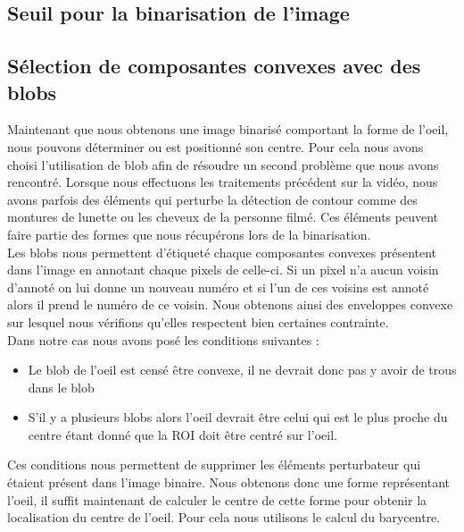 \subsection{Seuil pour la binarisation de l'image}


\subsection{Sélection de composantes convexes avec des blobs}
Maintenant que nous obtenons une image binarisé comportant la forme de l'oeil, nous pouvons déterminer ou est
positionné son centre. Pour cela nous avons choisi l'utilisation de blob afin de résoudre un second 
problème que nous avons rencontré. Lorsque nous effectuons les traitements précédent sur la vidéo, nous avons
parfois des éléments qui perturbe la détection de contour comme des montures de lunette ou les cheveux de la personne 
filmé. Ces éléments peuvent faire partie des formes que nous récupérons lors de la binarisation.\\ 

Les blobs nous permettent d'étiqueté chaque composantes convexes présentent dans l'image en annotant
chaque pixels de celle-ci. Si un pixel n'a aucun voisin d'annoté on lui donne un nouveau numéro et si
l'un de ces voisins est annoté alors il prend le numéro de ce voisin. Nous obtenons ainsi des enveloppes
convexe sur lesquel nous vérifions qu'elles respectent bien certaines contrainte.\\

Dans notre cas nous avons posé les conditions suivantes :
\begin{itemize}
 \item Le blob de l'oeil est censé être convexe, il ne devrait donc pas y avoir de trous dans le blob
 \item S'il y a plusieurs blobs alors l'oeil devrait être celui qui est le plus proche du centre étant
 donné que la ROI doit être centré sur l'oeil.
\end{itemize}
Ces conditions nous permettent de supprimer les éléments perturbateur qui étaient présent dans l'image binaire.
Nous obtenons donc une forme représentant l'oeil, il suffit maintenant de calculer le centre de cette forme
pour obtenir la localisation du centre de l'oeil. Pour cela nous utilisons le calcul du barycentre.